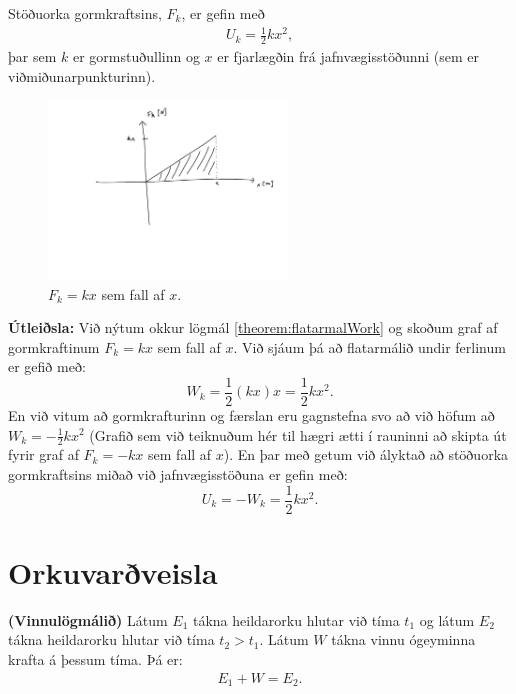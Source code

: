 \ifdefined \wholebook \else\documentclass[oneside]{book}\usepackage{EdlBook}\graphicspath{{figures/}}
\begin{document}
\begin{tcolorbox}
\begin{theorem}
Stöðuorka gormkraftsins, $F_k$, er gefin með
\begin{align*}
    U_k = \frac{1}{2}kx^2,
\end{align*}
þar sem $k$ er gormstuðullinn og $x$ er fjarlægðin frá jafnvægisstöðunni (sem er viðmiðunarpunkturinn).
\end{theorem}
\end{tcolorbox}

\begin{minipage}{\linewidth}
\begin{figure}
\includegraphics[width=2.5in]{temp/gormkraftur2.pdf}
\caption{$F_k = kx$ sem fall af $x$.}
\label{fig:gorm-work}
\end{figure}

\textbf{Útleiðsla:} Við nýtum okkur lögmál \ref{theorem:flatarmalWork} og skoðum graf af gormkraftinum $F_k = kx$ sem fall af $x$. Við sjáum þá að flatarmálið undir ferlinum er gefið með:
\begin{equation*}
    W_k = \frac{1}{2}(kx)x = \frac{1}{2}kx^2.
\end{equation*}
En við vitum að gormkrafturinn og færslan eru gagnstefna svo að við höfum að $W_k = -\frac{1}{2}kx^2$ (Grafið sem við teiknuðum hér til hægri ætti í rauninni að skipta út fyrir graf af $F_k = -kx$ sem fall af $x$). En þar með getum við ályktað að stöðuorka gormkraftsins miðað við jafnvægisstöðuna er gefin með:
\begin{equation*}
    U_k = -W_k = \frac{1}{2}kx^2.
\end{equation*}

\end{minipage}

\section{Orkuvarðveisla}


\begin{tcolorbox}
\begin{theorem}
\textbf{(Vinnulögmálið)} Látum $E_1$ tákna heildarorku hlutar við tíma $t_1$ og látum $E_2$ tákna heildarorku hlutar við tíma $t_2 > t_1$. Látum $W$ tákna vinnu ógeyminna krafta á þessum tíma. Þá er:
\begin{align*}
    E_1 + W = E_2.
\end{align*}
\end{theorem}
\end{tcolorbox}
\end{document}
